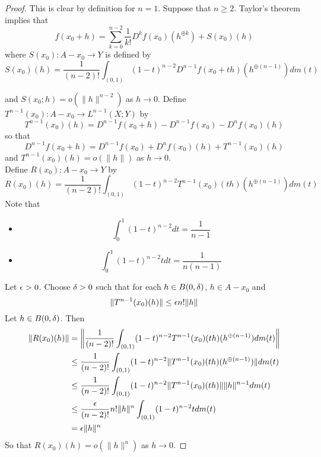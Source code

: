 \documentclass{book}
\begin{document}
	\begin{proof}
	This is clear by definition for $n = 1$. Suppose that $n \geq 2$. Taylor's theorem implies that $$f(x_0 + h) = \sum_{k=0}^{n-2} \frac{1}{k!} D^k f(x_0)(h^{\oplus k}) + S(x_0)(h)$$ 
	where $S(x_0): A - x_0 \rightarrow Y$ is defined by 
	$$S(x_0)(h) = \frac{1}{(n-2)!}\int_{(0,1)} (1-t)^{n-2}D^{n-1}f(x_0 + th)(h^{\oplus (n-1)})d m(t)$$
	
	and $S(x_0; h) = o(\|h\|^{n-2})$ as $h \rightarrow 0$.
	Define $T^{n-1}(x_0):A-x_0 \rightarrow L^{n-1}(X;Y)$ by 
	$$T^{n-1}(x_0)(h) = D^{n-1}f(x_0 + h) - D^{n-1}f(x_0) - D^nf(x_0)(h)$$ 
	so that 
	$$D^{n-1}f(x_0 + h) = D^{n-1}f(x_0) + D^nf(x_0)(h) + T^{n-1}(x_0)(h)$$ 
	and $T^{n-1}(x_0)(h) = o(\|h\|)$ as $h \rightarrow 0$. \\
	Define $R(x_0): A - x_0 \rightarrow Y$ by 
	$$R(x_0)(h) = \frac{1}{(n-2)!} \int_{(0,1)} (1-t)^{n-2}T^{n-1}(x_0)(th)(h^{\oplus (n-1)}) dm(t) $$
	Note that 
	\begin{itemize}
	\item $$\int_0^1 (1-t)^{n-2} dt = \frac{1}{n-1}$$
	\item $$\int_0^1 (1-t)^{n-2}t dt = \frac{1}{n(n-1)}$$
	\end{itemize}
	Let $\epsilon >0$. Choose $\delta >0$ such that for each $h \in B(0, \delta)$, $h \in A - x_0$ and $$\|T^{n-1}(x_0)(h)\| \leq \epsilon n! \|h\|$$ Let $h \in B(0, \delta)$. Then 
	\begin{align*}
	\|R(x_0)(h)\|
	&= \bigg \|  \frac{1}{(n-2)!} \int_{(0,1)} (1-t)^{n-2}T^{n-1}(x_0)(th)(h^{\oplus (n-1)}) dm(t) \bigg \| \\
	& \leq  \frac{1}{(n-2)!} \int_{(0,1)} (1-t)^{n-2}\|T^{n-1}(x_0)(th)(h^{\oplus (n-1)})\| dm(t) \\
	& \leq  \frac{1}{(n-2)!} \int_{(0,1)} (1-t)^{n-2} \|T^{n-1}(x_0)(th) \| \|h\|^{n-1} dm(t) \\
	& \leq  \frac{\epsilon}{(n-2)!}  n!  \|h\|^n \int_{(0,1)} (1-t)^{n-2} t  dm(t) \\		
	&= \epsilon \|h\|^n  
	\end{align*}
	So that $R(x_0)(h) = o(\|h\|^n)$ as $h \rightarrow 0$. 
	

\end{proof}
\end{document}
